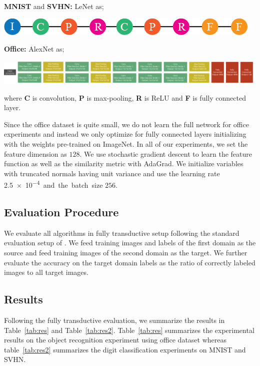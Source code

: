 \noindent \textbf{MNIST} and \textbf{SVHN:} LeNet\cite{lenet} as;

\includegraphics[width=\columnwidth]{lenet}


\noindent \textbf{Office:} AlexNet\cite{alexnet} as;

\includegraphics[width=\columnwidth]{alexnet}


where \textbf{C} is convolution, \textbf{P} is max-pooling, \textbf{R} is ReLU and \textbf{F} is fully connected layer. 

Since the office dataset is quite small, we do not learn the full network for office experiments and instead we only optimize for fully connected layers initializing with the weights pre-trained on ImageNet. In all of our experiments, we set the feature dimension as $128$. We use stochastic gradient descent to learn the feature function as well as the similarity metric with AdaGrad\cite{adagrad}. We initialize variables with truncated normals having unit variance and use the learning rate \SI{2.5e-4}  and the batch size $256$. 

\vspace{-2mm}
\subsection{Evaluation Procedure}
We evaluate all algorithms in fully transductive setup following the standard evaluation setup of \cite{office}.  We feed training images and labels of the first domain as the source and feed training images of the second domain as the target. We further evaluate the accuracy on the target domain labels as the ratio of correctly labeled images to all target images.

\vspace{-2mm}
\subsection{Results}
Following the fully transductive evaluation, we summarize the results in Table~\ref{tab:res} and Table~\ref{tab:res2}. Table~\ref{tab:res} summarizes the experimental results on the object recognition experiment using office dataset whereas  table~\ref{tab:res2} summarizes the digit classification experiments on MNIST and SVHN.

